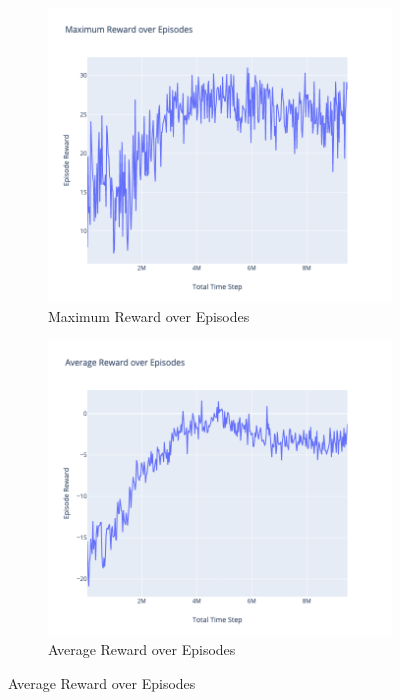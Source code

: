 \begin{figure}[!htb]
		\centering
		\begin{subfigure}[!htb]{0.35\textwidth}
				\centering
				\includegraphics[width=\textwidth]{figures/exps/1st_exp/max_eps_reward}
				\caption{Maximum Reward over Episodes}
				\label{fig:max_eps_reward}
		\end{subfigure}
		\hfill
		\begin{subfigure}[!htb]{0.35\textwidth}
				\centering
				\includegraphics[width=\textwidth]{figures/exps/1st_exp/avg_eps_reward}
				\caption{Average Reward over Episodes}
				\label{fig:avg_eps_reward}
		\end{subfigure}
		\hfill


\end{figure}

